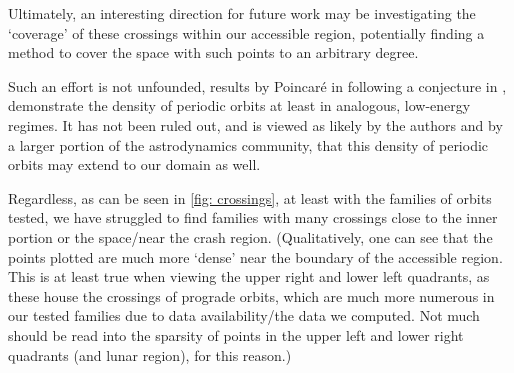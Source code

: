     


    



    Ultimately, an interesting direction for future work may be investigating the `coverage' of these crossings within our accessible region, potentially finding a method to cover the space with such points to an arbitrary degree.


    Such an effort is not unfounded, results by Poincaré in \cite{Poincare_1893} following a conjecture in \cite{Poincare_1892}, demonstrate the density of periodic orbits at least in analogous, low-energy regimes. It has not been ruled out, and is viewed as likely by the authors and by a larger portion of the astrodynamics community, that this density of periodic orbits may extend to our domain as well.

    Regardless, as can be seen in \cref{fig: crossings}, at least with the families of orbits tested, we have struggled to find families with many crossings close to the inner portion or the space/near the crash region. (Qualitatively, one can see that the points plotted are much more `dense' near the boundary of the accessible region. This is at least true when viewing the upper right and lower left quadrants, as these house the crossings of prograde orbits, which are much more numerous in our tested families due to data availability/the data we computed. Not much should be read into the sparsity of points in the upper left and lower right quadrants (and lunar region), for this reason.)






